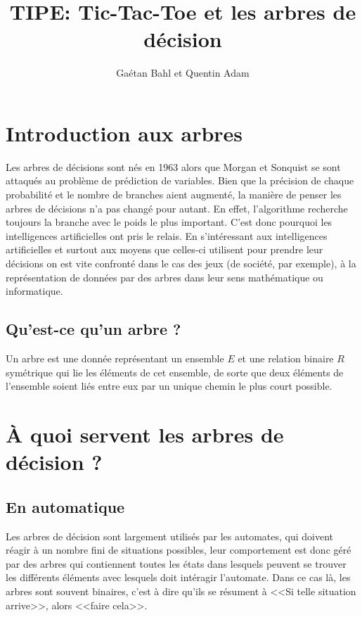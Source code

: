 \documentclass{article}
\title{TIPE: Tic-Tac-Toe et les arbres de décision}
\author{Gaétan Bahl et Quentin Adam}
\begin{document}
\maketitle
\tableofcontents


\clearpage

\section{Introduction aux arbres}

Les arbres de décisions sont nés en 1963 alors que Morgan et Sonquist se sont attaqués au problème de prédiction de variables. Bien que la précision de chaque probabilité et le nombre de branches aient augmenté, la manière de penser les arbres de décisions n'a pas changé pour autant. En effet, l'algorithme recherche toujours la branche avec le poids le plus important. C'est donc pourquoi les intelligences artificielles ont pris le relais.
En s'intéressant aux intelligences artificielles et surtout aux moyens que
celles-ci utilisent pour prendre leur décisions
on est vite confronté dans le cas des jeux (de société, par exemple), à la
représentation de données par des arbres dans leur sens mathématique ou
informatique.


\subsection{Qu'est-ce qu'un arbre ?}

Un arbre est une donnée représentant un ensemble $E$ et une relation binaire $R$
symétrique qui lie les éléments de cet ensemble,
de sorte que deux éléments de l'ensemble soient liés entre eux par un unique
chemin le plus court possible.






\section{\uppercase{à} quoi servent les arbres de décision ?}

\subsection{En automatique}

Les arbres de décision sont largement utilisés par les automates,
 qui doivent réagir à un nombre fini de situations possibles, 
leur comportement est donc géré par des arbres qui contiennent
 toutes les états dans lesquels peuvent se trouver les différents 
éléments avec lesquels doit intéragir l'automate.
Dans ce cas là, les arbres sont souvent binaires, 
c'est à dire qu'ils se résument à <<Si telle situation arrive>>, alors <<faire
cela>>.
\end{document}
